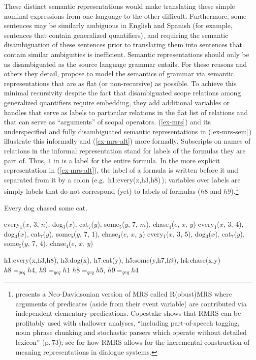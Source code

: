 \documentclass[output=paper]{langsci/langscibook}
\begin{document}
These distinct semantic representations would make translating these simple nominal expressions from one language to the other difficult. Furthermore, some sentences may be similarly ambiguous in English and Spanish (for example, sentences that contain generalized quantifiers), and requiring the semantic disambiguation of these sentences prior to translating them into sentences that contain similar ambiguities is inefficient. Semantic representations should only be as disambiguated as the source language grammar entails. For these reasons and others they detail, \citet{Copestakeetal1995} propose to model the semantics of grammar via semantic representations that are as flat (or non-recursive) as possible. To achieve this minimal recursivity despite the fact that disambiguated scope relations among generalized quantifiers require embedding, they add additional variables or handles that serve as labels to particular relations in the flat list of relations and that can serve as ``arguments'' of scopal operators. (\ref{ex-mrs}) and its underspecified and fully disambiguated semantic representations in (\ref{ex-mrs-sem}) illustrate this informally and (\ref{ex-mrs-alt}) more formally. Subscripts on names of relations in the informal representation stand for labels of the formulas they are part of. Thus, $1$ in  is a label for the entire formula. In the more explicit representation in (\ref{ex-mrs-alt}), the label of a formula is written before it and separated from it by a colon (e.g.\ h1:every(x,h3,h8)\,); 
variables over labels are simply labels that do not correspond (yet) to labels of formulas ($h8$ and $h9$).\footnote{\citet{Copestake2007} presents a Neo-Davidsonian version of MRS called R(obust)MRS where arguments of predicates (aside from their event variable) are contributed via independent elementary predications. Copestake shows that RMRS can be profitably used with shallower analyses, ``including part-of-speech tagging, noun phrase chunking and stochastic parsers which operate without detailed lexicon'' (p.\,73); see \citet{PeldzusandSchlangen2012} for how RMRS allows for the incremental construction of meaning representations in dialogue systems.}

\begin{exe}
\ex\label{ex-mrs}
Every dog chased some cat.
\ex\label{ex-mrs-sem}
\begin{xlist}
\ex\label{ex-mrs-sem-a}
every$_{1}$($x$, 3, $n$), dog$_{3}$($x$), cat$_{7}$($y$), some$_{5}$($y$, 7, $m$), chase$_{4}$($e$, $x$, $y$)
\ex\label{ex-mrs-sem-b}
every$_{1}$($x$, 3, 4), dog$_{3}$($x$), cat$_{7}$($y$), some$_{5}$($y$, 7, 1), chase$_{4}$($e$, $x$, $y$)
\ex\label{ex-mrs-sem-c}
every$_{1}$($x$, 3, 5), dog$_{3}$($x$), cat$_{7}$($y$), some$_{5}$($y$, 7, 4), chase$_{4}$($e$, $x$, $y$)
\end{xlist}
\ex\label{ex-mrs-alt}
\begin{xlist}
\ex\label{ex-mrs-alt-a}
h1:every(x,h3,h8), h3:dog(x), h7:cat(y), h5:some(y,h7,h9), h4:chase(x,y)
\ex\label{ex-mrs-alt-b}
$h8=_{qeq}h4$, $h9=_{qeq}h1$
\ex\label{ex-mrs-alt-c}
$h8=_{qeq}h5$, $h9=_{qeq}h4$
\end{xlist}
\end{exe} 
\end{document}
